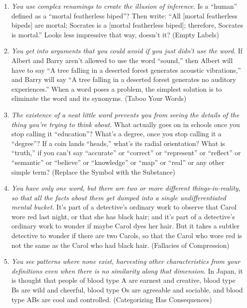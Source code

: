 {\begin{enumerate}
\item {
 \textit{You use complex renamings to create the illusion of
inference.} Is a ``human'' defined
as a ``mortal featherless biped''?
Then write: ``All [mortal featherless bipeds] are
mortal; Socrates is a [mortal featherless biped]; therefore, Socrates
is mortal.'' Looks less impressive that way,
doesn't it? (Empty Labels)}

\item {
 \textit{You get into arguments that you could avoid if you just
didn't use the word.} If Albert and Barry
aren't allowed to use the word
``sound,'' then Albert will have to
say ``A tree falling in a deserted forest generates
acoustic vibrations,'' and Barry will say
``A tree falling in a deserted forest generates no
auditory experiences.'' When a word poses a problem,
the simplest solution is to eliminate the word and its synonyms. (Taboo
Your Words)}

\item {
 \textit{The existence of a neat little word prevents you from
seeing the details of the thing you're trying to think
about.} What actually goes on in schools once you stop calling it
``education''?
What's a degree, once you stop calling it a
``degree''? If a coin lands
``heads,'' what's
its radial orientation? What is
``truth,'' if you
can't say
``accurate'' or
``correct'' or
``represent'' or
``reflect'' or
``semantic'' or
``believe'' or
``knowledge'' or
``map'' or
``real'' or any other simple term?
(Replace the Symbol with the Substance)}

\item {
 \textit{You have only one word, but there are two or more
different things-in-reality, so that all the facts about them get
dumped into a single undifferentiated mental bucket.}
It's part of a detective's ordinary
work to observe that Carol wore red last night, or that she has black
hair; and it's part of a detective's
ordinary work to wonder if maybe Carol dyes her hair. But it takes a
subtler detective to wonder if there are two Carols, so that the Carol
who wore red is not the same as the Carol who had black hair.
(Fallacies of Compression)}

\item {
 \textit{You see patterns where none exist, harvesting other
characteristics from your }\textit{definitions even when there is no
similarity along that dimension.} In Japan, it is thought that people
of blood type A are earnest and creative, blood type Bs are wild and
cheerful, blood type Os are agreeable and sociable, and blood type ABs
are cool and controlled. (Categorizing Has Consequences)}


\end{enumerate}}

